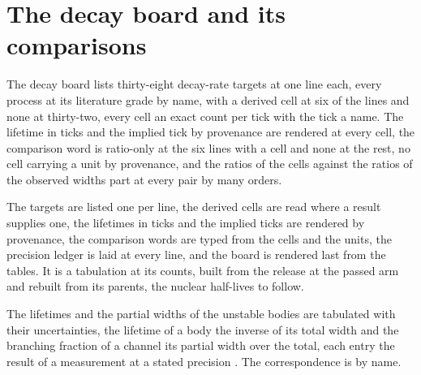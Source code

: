 \section{The decay board and its comparisons}\label{mod:IX-1-D538449-the-decay-board-release-one}
\begin{chtable}\label{box:IX-1-D538449-the-decay-board-release-one:1}
The decay board lists thirty-eight decay-rate targets at one line each, every process at its literature grade by name, with a derived cell at six of the lines and none at thirty-two, every cell an exact count per tick with the tick a name. The lifetime in ticks and the implied tick by provenance are rendered at every cell, the comparison word is ratio-only at the six lines with a cell and none at the rest, no cell carrying a unit by provenance, and the ratios of the cells against the ratios of the observed widths part at every pair by many orders.
\end{chtable}
The targets are listed one per line, the derived cells are read where a result supplies one, the lifetimes in ticks and the implied ticks are rendered by provenance, the comparison words are typed from the cells and the units, the precision ledger is laid at every line, and the board is rendered last from the tables. It is a tabulation at its counts, built from the release at the passed arm and rebuilt from its parents, the nuclear half-lives to follow.
\begin{chbridge}
The lifetimes and the partial widths of the unstable bodies are tabulated with their uncertainties, the lifetime of a body the inverse of its total width and the branching fraction of a channel its partial width over the total, each entry the result of a measurement at a stated precision \cite{Fermi1934,Weinberg1967}. The correspondence is by name.
\end{chbridge}
